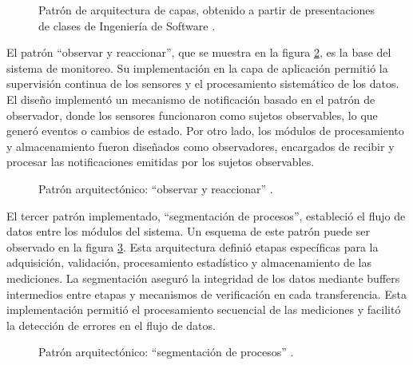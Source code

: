 \begin{figure} [H]
	\centering
	\small
	
	\caption{Patrón de arquitectura de capas, obtenido a partir de presentaciones de clases de Ingeniería de Software \protect\footnotemark.}
	\label{fig:patroncapas}
\end{figure}

El patrón ``observar y reaccionar'', que se muestra en la figura \ref{fig:patronobservarreaccionar}, es la base del sistema de monitoreo. Su implementación en la capa de aplicación permitió la supervisión continua de los sensores y el procesamiento sistemático de los datos. El diseño implementó un mecanismo de notificación basado en el patrón de observador, donde los sensores funcionaron como sujetos observables, lo que generó eventos o cambios de estado. Por otro lado, los módulos de procesamiento y almacenamiento fueron diseñados como observadores, encargados de recibir y procesar las notificaciones emitidas por los sujetos observables.

\begin{figure}[H]
	\footnotesize
	\centering
	
	\caption{Patrón arquitectónico: ``observar y reaccionar'' \protect\footnotemark.}
	\label{fig:patronobservarreaccionar}
\end{figure}

El tercer patrón implementado, ``segmentación de procesos'', estableció el flujo de datos entre los módulos del sistema. Un esquema de este patrón puede ser observado en la figura \ref{fig:patronsegmentacionprocesos}. Esta arquitectura definió etapas específicas para la adquisición, validación, procesamiento estadístico y almacenamiento de las mediciones. La segmentación aseguró la integridad de los datos mediante buffers intermedios entre etapas y mecanismos de verificación en cada transferencia. Esta implementación permitió el procesamiento secuencial de las mediciones y facilitó la detección de errores en el flujo de datos.

\begin{figure}[H]
	\centering
	\small

	\caption{ Patrón arquitectónico: “segmentación de procesos” \protect\footnotemark.}
	\label{fig:patronsegmentacionprocesos}
\end{figure}


